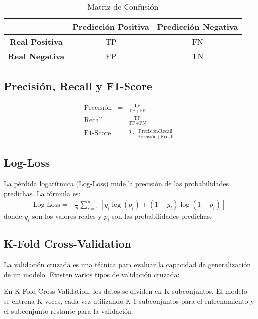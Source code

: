 \documentclass[a4paper]{report} %
\begin{document}
\begin{table}[h]
\centering
\begin{tabular}{|c|c|c|}
\hline
 & \textbf{Predicci\'on Positiva} & \textbf{Predicci\'on Negativa} \\
\hline
\textbf{Real Positiva} & TP & FN \\
\hline
\textbf{Real Negativa} & FP & TN \\
\hline
\end{tabular}
\caption{Matriz de Confusi\'on}
\label{tab:confusion_matrix}
\end{table}
\subsection{Precisi\'on, Recall y F1-Score}
\begin{eqnarray}
\text{Precisi\'on} &=& \frac{\text{TP}}{\text{TP} + \text{FP}} \\
\text{Recall} &=& \frac{\text{TP}}{\text{TP} + \text{FN}} \\
\text{F1-Score} &=& 2 \cdot \frac{\text{Precisi\'on} \cdot \text{Recall}}{\text{Precisi\'on} + \text{Recall}}
\end{eqnarray}
\subsection{Log-Loss}
La p\'erdida logar\'itmica (Log-Loss) mide la precisi\'on de las probabilidades predichas. La f\'ormula es:
\begin{eqnarray}
\text{Log-Loss} = -\frac{1}{n} \sum_{i=1}^{n} \left[ y_i \log(p_i) + (1 - y_i) \log(1 - p_i) \right]
\end{eqnarray}
donde $y_i$ son los valores reales y $p_i$ son las probabilidades predichas.
\subsection{K-Fold Cross-Validation}
La validaci\'on cruzada es una t\'ecnica para evaluar la capacidad de generalizaci\'on de un modelo. Existen varios tipos de validaci\'on cruzada:


En K-Fold Cross-Validation, los datos se dividen en K subconjuntos. El modelo se entrena K veces, cada vez utilizando K-1 subconjuntos para el entrenamiento y el subconjunto restante para la validaci\'on.
\end{document}
